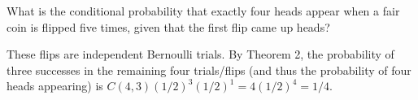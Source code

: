 \documentclass[../main.tex]{subfiles}
\begin{document}
What is the conditional probability that exactly four heads appear when a fair coin is flipped five times, given that the first flip came up heads?

\solution
These flips are independent Bernoulli trials.
By Theorem 2, the probability of three successes in the remaining four trials/flips (and thus the probability of four heads appearing) is
\(
	C(4, 3)(1/2)^3(1/2)^1 = 4(1/2)^4 = 1/4.
\)
\end{document}
